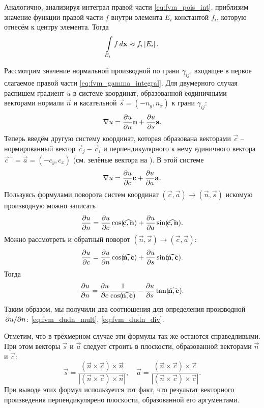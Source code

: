 Аналогично, анализируя интеграл правой части \cref{eq:fvm_pois_int},
приблизим значение функции правой части $f$ внутри элемента $E_i$ константой $f_i$,
которую отнесём к центру элемента. Тогда
\begin{equation}
\label{eq:fvm_f_integral}
\arint{f}{E_i}{\vec x} \approx f_i \left|E_i\right|.
\end{equation}

Рассмотрим значение нормальной производной по грани $\gamma_{ij}$,
входящее в первое слагаемое правой части \cref{eq:fvm_gamma_integral}.
Для двумерного случая распишем градиент $u$ в системе координат,
образованной еодиничными векторами нормали $\vec n$ и касательной $\vec s = (-n_y, n_x)$
к грани $\gamma_{ij}$:
$$
\nabla u = \frac{\partial u}{\partial n}\boldsymbol{\rm n} + \frac{\partial u}{\partial s} \boldsymbol{\rm s}.
$$
Теперь введём другую систему координат, которая образована
векторами $\vec c$ -- нормированный вектор $\vec c_j - \vec c_i$
и перпендикулярного к нему единичного вектора $\vec c^\perp = \vec a = (-c_y, c_x)$
(см. зелёные вектора на ).
В этой системе
$$
\nabla u = \frac{\partial u}{\partial c}\boldsymbol{\rm c} + \frac{\partial u}{\partial a} \boldsymbol{\rm a}.
$$
Пользуясь формулами поворота систем координат $(\vec c, \vec a) \to (\vec n, \vec s)$
искомую производную можно записать
\begin{equation}
\label{eq:fvm_dudn_mult}
\dfr{u}{n} = \dfr{u}{c} \cos(\vecangle{c}{n}) + \dfr{u}{a} \sin(\vecangle{c}{n}).
\end{equation}
Можно рассмотреть и обратный поворот $(\vec n, \vec s) \to (\vec c, \vec a)$:
$$
\dfr{u}{c} = \dfr{u}{n} \cos(\vecangle{n}{c}) + \dfr{u}{s} \sin(\vecangle{n}{c}).
$$
Тогда
\begin{equation}
\label{eq:fvm_dudn_div}
\dfr{u}{n} = \dfr{u}{c} \frac{1}{\cos(\vecangle{n}{c})} - \dfr{u}{s} \tan(\vecangle{n}{c}).
\end{equation}
Таким образом, мы получили два соотношения для определения производной $\left.\partial u\middle/\partial n\right.$: \cref{eq:fvm_dudn_mult}, \cref{eq:fvm_dudn_div}.

Отметим, что в трёхмерном случае эти формулы так же остаются справедливыми.
При этом векторы $\vec s$ и $\vec a$ следует строить в плоскости, образованной векторами $\vec n$ и $\vec c$:
\begin{equation*}
\vec s = \frac{\left(\vec n \times \vec c\right) \times \vec n}{\left|\left(\vec n \times \vec c\right) \times \vec n\right|}, \quad
\vec a = \frac{\left(\vec n \times \vec c\right) \times \vec c}{\left|\left(\vec n \times \vec c\right) \times \vec c\right|}.
\end{equation*}
При выводе этих формул используется тот факт, что результат векторного произведения перпендикулярено плоскости, образованной его аргументами.

